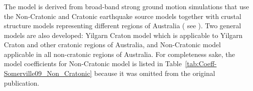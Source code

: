 \subsubsection{\citet{eqrm_Somerville09}}

The \citet{eqrm_Somerville09} model is derived from broad-band
strong ground motion simulations that use the Non-Cratonic and
Cratonic earthquake source models together with crustal structure
models representing different regions of Australia ( see
\citet[Table 7-1]{eqrm_Somerville09}). Two general models are also
developed: Yilgarn Craton model which is applicable to Yilgarn
Craton and other cratonic regions of Australia, and Non-Cratonic
model applicable in all non-cratonic regions of Australia. For
completeness sake, the model coefficients for Non-Cratonic model is
listed in Table~\ref{tab:Coeff-Somerville09_Non_Cratonic} because it
was omitted from the original publication.

